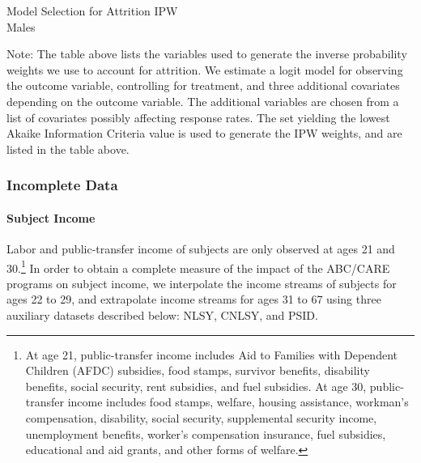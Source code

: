 \begin{table}
\caption{Model Selection for Attrition IPW \\ Males }
\label{table:ms_attrit_males}
\centering
\begin{adjustbox}{max width=\textwidth}
\begin{threeparttable}

\begin{tablenotes}
\tiny
\item Note: The table above lists the variables used to generate the
inverse probability weights we use to account for attrition. We estimate a logit model for observing the outcome variable,
controlling for treatment, and three additional covariates depending on the outcome
variable. The additional variables are chosen from a list of covariates possibly affecting
response rates. The set yielding the lowest Akaike Information Criteria value is used to
generate the IPW weights, and are listed in the table above.
\end{tablenotes}
\end{threeparttable}
\end{adjustbox}
\end{table}


\subsubsection{Incomplete Data}
\label{app:method_noobs}

\paragraph{Subject Income}

\noindent Labor and public-transfer income of subjects are only observed at ages 21 and 30.\footnote{At age 21, public-transfer income includes Aid to
Families with Dependent Children (AFDC) subsidies, food stamps, survivor benefits, disability
benefits, social security, rent subsidies, and fuel subsidies. At age 30, public-transfer income includes food stamps, welfare, housing assistance, workman's
compensation, disability, social security, supplemental security income, unemployment benefits,
worker's compensation insurance, fuel subsidies, educational and aid grants, and other forms of welfare.} In order to obtain a complete measure of the impact of the ABC/CARE programs on subject income, we interpolate the income streams of subjects for ages 22 to 29, and extrapolate income streams for ages 31 to 67 using three auxiliary datasets described below: NLSY, CNLSY, and PSID. \\

